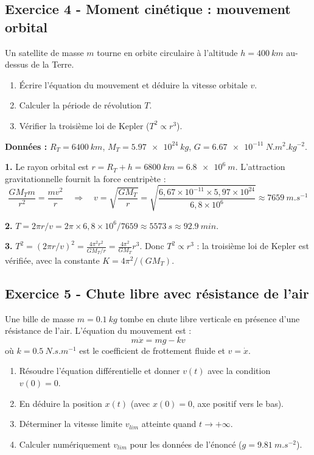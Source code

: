 \documentclass[12pt,a4paper]{article}
\begin{document}
\subsection*{Exercice 4 - Moment cinétique : mouvement orbital \niveau{\moyen}}

\begin{boiteexercice}
Un satellite de masse $m$ tourne en orbite circulaire à l'altitude $h = \qty{400}{km}$ au-dessus de la Terre.
\begin{enumerate}
  \item Écrire l'équation du mouvement et déduire la vitesse orbitale $v$.
  \item Calculer la période de révolution $T$.
  \item Vérifier la troisième loi de Kepler ($T^2 \propto r^3$).
\end{enumerate}
\textbf{Données :} $R_T = \qty{6400}{km}$, $M_T = \qty{5.97e24}{kg}$, $G = \qty{6.67e-11}{N.m^2.kg^{-2}}$.
\end{boiteexercice}

\begin{boitecorrige}
\textbf{1.} Le rayon orbital est $r = R_T + h = \qty{6800}{km} = \qty{6.8e6}{m}$. L'attraction gravitationnelle fournit la force centripète :
\[
\frac{GM_Tm}{r^2} = \frac{mv^2}{r} \quad \Rightarrow \quad v = \sqrt{\frac{GM_T}{r}} = \sqrt{\frac{6{,}67\times10^{-11}\times5{,}97\times10^{24}}{6{,}8\times10^6}} \approx \qty{7659}{m.s^{-1}}
\]

\textbf{2.} $T = 2\pi r/v = 2\pi\times6{,}8\times10^6/7659 \approx \qty{5573}{s} \approx \qty{92.9}{min}$.

\textbf{3.} $T^2 = (2\pi r/v)^2 = \frac{4\pi^2 r^2}{GM_T/r} = \frac{4\pi^2}{GM_T}r^3$. Donc $T^2\propto r^3$ : la troisième loi de Kepler est vérifiée, avec la constante $K = 4\pi^2/(GM_T)$.
\end{boitecorrige}


\subsection*{Exercice 5 - Chute libre avec résistance de l'air \niveau{\moyen}}

\begin{boiteexercice}
Une bille de masse $m = \qty{0.1}{kg}$ tombe en chute libre verticale en présence d'une résistance de l'air. L'équation du mouvement est :
\[
m\ddot{x} = mg - kv
\]
où $k = \qty{0.5}{N.s.m^{-1}}$ est le coefficient de frottement fluide et $v = \dot{x}$.
\begin{enumerate}
  \item Résoudre l'équation différentielle et donner $v(t)$ avec la condition $v(0) = 0$.
  \item En déduire la position $x(t)$ (avec $x(0) = 0$, axe positif vers le bas).
  \item Déterminer la vitesse limite $v_{lim}$ atteinte quand $t \to +\infty$.
  \item Calculer numériquement $v_{lim}$ pour les données de l'énoncé ($g = \qty{9.81}{m.s^{-2}}$).
\end{enumerate}
\end{boiteexercice}
\end{document}
